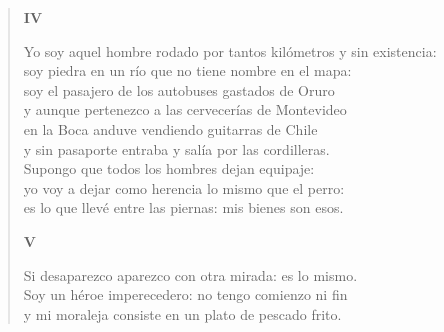 \documentclass[12pt]{article}
\begin{document}
\begin{verse}
{\bfseries\scshape {IV}}

Yo soy aquel hombre rodado por tantos kilómetros y sin existencia:\\
soy piedra en un río que no tiene nombre en el mapa:\\
soy el pasajero de los autobuses gastados de Oruro\\
y aunque pertenezco a las cervecerías de Montevideo\\
en la Boca anduve vendiendo guitarras de Chile\\
y sin pasaporte entraba y salía por las cordilleras.\\
Supongo que todos los hombres dejan equipaje:\\
yo voy a dejar como herencia lo mismo que el perro:\\
es lo que llevé entre las piernas: mis bienes son esos.  

{\bfseries\scshape {V}}

Si desaparezco aparezco con otra mirada: es lo mismo.\\
Soy un héroe imperecedero: no tengo comienzo ni fin\\
y mi moraleja consiste en un plato de pescado frito.  
\end{verse}
\end{document}
